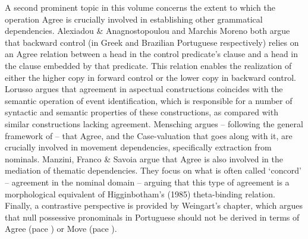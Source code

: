 \documentclass[output=paper]{langsci/langscibook}
\begin{document}
A second prominent topic in this volume concerns the extent to which the operation Agree is crucially involved in establishing other grammatical dependencies. Alexiadou \& Anagnostopoulou and Marchis Moreno both argue that backward control (in Greek and Brazilian Portuguese respectively) relies on an Agree relation between a head in the control predicate’s clause and a head in the clause embedded by that predicate. This relation enables the realization of either the higher copy in forward control or the lower copy in backward control. Lorusso argues that agreement in aspectual constructions coincides with the semantic operation of event identification, which is responsible for a number of syntactic and semantic properties of these constructions, as compared with similar constructions lacking agreement. Mensching argues – following the general framework of \citet{Chomsky2000,Chomsky2001} – that Agree, and the Case-valuation that goes along with it, are crucially involved in movement dependencies, specifically extraction from nominals. Manzini, Franco \& Savoia argue that Agree is also involved in the mediation of thematic dependencies. They focus on what is often called ‘concord’ – agreement in the nominal domain – arguing that this type of agreement is a morphological equivalent of Higginbotham’s (1985) theta-binding relation. Finally, a contrastive perspective is provided by Weingart’s chapter, which argues that null possessive pronominals in Portuguese should not be derived in terms of Agree (pace \citealt{Hicks2009}) or Move (pace \citealt{Floripi2009,Rodrigues2010}).
\end{document}

